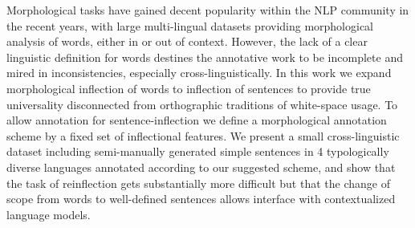Morphological tasks have gained decent popularity within the NLP community in the recent years, with large multi-lingual datasets providing morphological analysis of words, either in or out of context. However, the lack of a clear linguistic definition for words destines the annotative work to be incomplete and mired in inconsistencies, especially cross-linguistically. In this work we expand morphological inflection of words to inflection of sentences to provide true universality disconnected from orthographic traditions of white-space usage. To allow annotation for sentence-inflection we define a morphological annotation scheme by a fixed set of inflectional features. We present a small cross-linguistic dataset including semi-manually generated simple sentences in 4 typologically diverse languages annotated according to our suggested scheme, and show that the task of reinflection gets substantially more difficult but that the change of scope from words to well-defined sentences allows interface with contextualized language models.
